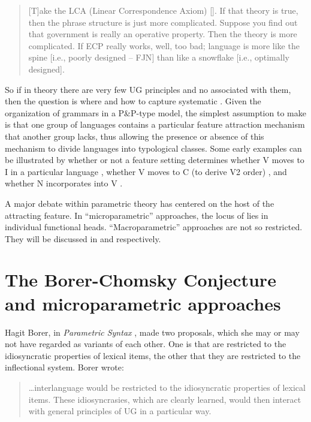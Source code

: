 \documentclass[output=paper,
modfonts
]{LSP/langsci}
\begin{document}
\begin{quote}
{[}T{]}ake the LCA (Linear Correspondence Axiom) [\citealt{kayne1994}]. If
that theory is true, then the phrase structure is just more complicated.
Suppose you find out that government is really an operative property.
Then the theory is more complicated. If ECP really works, well, too bad;
language is more like the spine {[}i.e., poorly designed  --  FJN{]} than
like a snowflake {[}i.e., optimally designed{]}. \citep[136]{chomsky2002}
\end{quote}

So if in theory there are very few UG principles and no 
associated with them, then the question is where and how to capture
systematic . Given the organization of grammars
in a P\&P-type model, the simplest assumption to make is that one group
of languages contains a particular feature attraction mechanism that
another group lacks, thus allowing the presence or absence of this
mechanism to divide languages into typological classes. Some early
examples can be illustrated by whether or not a feature setting
determines whether V moves to I in a particular language \citep{emonds1978,pollock1989}, whether V moves to C (to derive V2 order) \citep{den1977a}, and whether N incorporates into V \citep{baker1988}.

A major debate within parametric theory has centered on the host of the
attracting feature. In ``microparametric'' approaches, the locus of
 lies in individual functional heads. ``Macroparametric''
approaches are not so restricted. They will be discussed in  and 
respectively.

\section{The Borer-Chomsky Conjecture and microparametric approaches}\label{sec:newmeyer:3}

Hagit Borer, in \emph{Parametric Syntax} \citep{borer1984}, made two
proposals, which she may or may not have regarded as variants of each
other. One is that  are restricted to the idiosyncratic
properties of lexical items, the other that they are restricted to the
inflectional system. Borer wrote:

\begin{quote}
\ldots{}interlanguage  would be restricted to the idiosyncratic
properties of lexical items. These idiosyncrasies, which are clearly
learned, would then interact with general principles of UG in a
particular way. \citep[2--3]{borer1984}
\end{quote}
\end{document}
